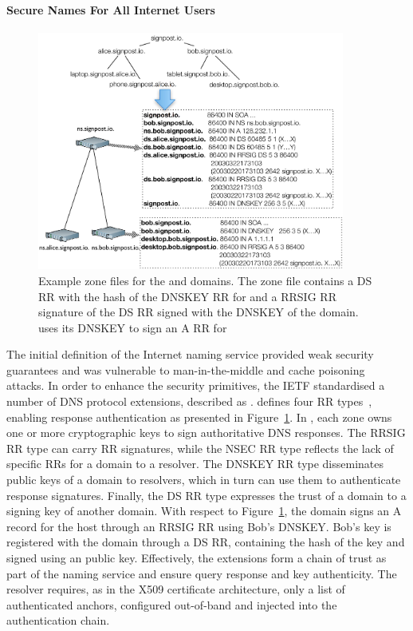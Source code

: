 \paragraph{Secure Names For All Internet Users}

\begin{figure}
  \centering
    \includegraphics[width=0.9\textwidth]{Chapter3/Chapter3Figs/DNSSEC_hierarchy}
    \caption[Example \dnssec zone files.]{Example \dnssec zone files for the
         and  domains. The  zone file
        contains a DS RR with the hash of the DNSKEY RR for   and a
        RRSIG RR signature of the DS RR signed with the DNSKEY of the
         domain.  uses its DNSKEY to sign an A RR for
        }
  \label{fig:dnssec_hierarchy}
\end{figure}

The initial definition of the Internet naming service provided weak security
guarantees and was vulnerable to man-in-the-middle and cache
poisoning~ attacks.  In order to enhance the security
primitives, the IETF standardised a number of DNS protocol extensions, described
as \dnssec.  \dnssec defines four RR types~, enabling response
authentication as presented in Figure~\ref{fig:dnssec_hierarchy}.  In \dnssec,
each zone owns one or more cryptographic keys to sign authoritative DNS
responses. The RRSIG RR type can carry RR signatures,
while the NSEC RR type reflects the lack of specific RRs for a domain to a
resolver.  The DNSKEY RR type disseminates public keys of a domain to resolvers,
which in turn can use them to authenticate response signatures. Finally, the DS
RR type expresses the trust of a domain to a signing key of another domain. With
respect to Figure~\ref{fig:dnssec_hierarchy}, the domain  signs an A
record for the host  through an RRSIG RR using Bob's DNSKEY\@.
Bob's key is registered with the  domain through a DS RR, containing the
hash of the key and signed using an  public key.  Effectively, the \dnssec
extensions form a chain of trust as part of the naming service and ensure
query response and key authenticity. The resolver requires, as in the X509
certificate architecture, only a list of authenticated anchors, configured
out-of-band and injected into the authentication chain.

